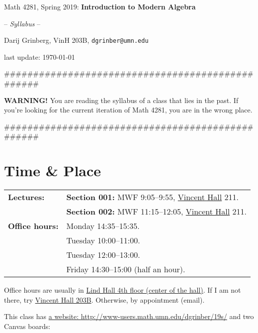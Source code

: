 \documentclass[numbers=enddot,12pt,final,onecolumn,notitlepage]{scrartcl}%
\theoremstyle{definition}
\newenvironment{noncompile}{}{}
\begin{document}
\begin{center}
Math 4281, Spring 2019: \textbf{Introduction to Modern Algebra}

-- \textit{Syllabus} --

Darij Grinberg, VinH 203B, \texttt{dgrinber@umn.edu}

last update: \today

\end{center}

\bigskip

\#\#\#\#\#\#\#\#\#\#\#\#\#\#\#\#\#\#\#\#\#\#\#\#\#\#\#\#\#\#\#\#\#\#\#\#\#\#\#\#\#\#\#\#\#\#\#\#\#

\textbf{WARNING!} You are reading the syllabus of a class that lies in the
past. If you're looking for the current iteration of Math 4281, you are in the
wrong place.

\#\#\#\#\#\#\#\#\#\#\#\#\#\#\#\#\#\#\#\#\#\#\#\#\#\#\#\#\#\#\#\#\#\#\#\#\#\#\#\#\#\#\#\#\#\#\#\#\#

\bigskip

\section{Time \& Place}%

\begin{tabular}
[c]{|ll|}\hline
\textbf{Lectures:} & \textbf{Section 001:} MWF 9:05--9:55,
\href{http://campusmaps.umn.edu/vincent-hall}{Vincent Hall} 211.\\
& \textbf{Section 002:} MWF 11:15--12:05,
\href{http://campusmaps.umn.edu/vincent-hall}{Vincent Hall} 211.\\\hline
\textbf{Office hours:} & Monday 14:35--15:35.\\
& Tuesday 10:00--11:00.\\
& Tuesday 12:00--13:00.\\
& Friday 14:30--15:00 (half an hour).\\\hline
\end{tabular}


\begin{noncompile}
\vspace{0.1cm}Office hours are usually in
\href{http://campusmaps.umn.edu/lind-hall}{Lind Hall 4th floor (center of the
hall)}. If I am not there, try
\href{http://campusmaps.umn.edu/vincent-hall}{Vincent Hall 203B}. Otherwise,
by appointment (email).
\end{noncompile}

\bigskip

This class has \href{http://www-users.math.umn.edu/~dgrinber/19s/}{a website:
http://www-users.math.umn.edu/dgrinber/19s/} and two Canvas boards:
\end{document}
